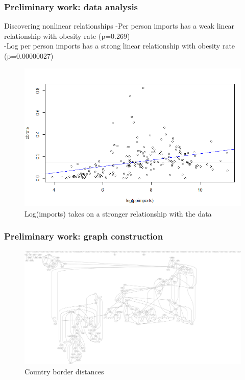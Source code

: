 \documentclass{beamer}
\begin{document}
\begin{frame}
\frametitle{Preliminary work: data analysis}
\begin{block}
{Discovering nonlinear relationships}
-Per person imports has a weak linear relationship with obesity rate (p=0.269)
\\
-Log per person imports has a strong linear relationship with obesity rate (p=0.00000027)
\end{block}

\begin{figure}
\label{fig:logs}
\caption{Log(imports) takes on a stronger relationship with the data}
\centering
\includegraphics[scale=0.4]{ppimports_log.PNG}
\end{figure}
\end{frame}

\begin{frame}
\frametitle{Preliminary work: graph construction}
\begin{figure}
\label{fig:borders}
\caption{Country border distances}
\centering
\includegraphics[scale=0.05]{edges.PNG}
\end{figure}
\end{frame}
\end{document}
